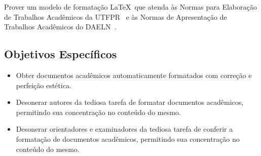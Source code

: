 Prover um modelo de formata\c{c}\~ao \LaTeX\ que atenda \`as Normas para Elabora\c{c}\~ao de Trabalhos Acad\^emicos da UTFPR~\cite{UTFPR2008} e \`as Normas de Apresenta\c{c}\~ao de Trabalhos Acad\^emicos do DAELN~\cite{DAELN2006}.

\subsection{Objetivos Espec\'ificos}

\begin{itemize}
	\item Obter documentos acad\^emicos automaticamente formatados com corre\c{c}\~ao e perfei\c{c}\~ao est\'etica.
	\item Desonerar autores da tediosa tarefa de formatar documentos acad\^emicos, permitindo sua concentra\c{c}\~ao no conte\'udo do mesmo.
	\item Desonerar orientadores e examinadores da tediosa tarefa de conferir a formata\c{c}\~ao de documentos acad\^emicos, permitindo sua concentra\c{c}\~ao no conte\'udo do mesmo.
\end{itemize}

